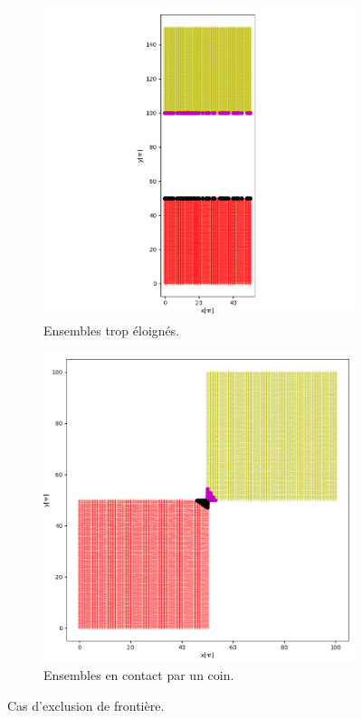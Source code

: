 \documentclass[12pt]{article}
\begin{document}
    \begin{figure}[ht!]
        \centering
        \begin{subfigure}[b]{0.475\textwidth}
            \centering
            \includegraphics[width=\textwidth]{Images/Frontiere_pts_carre1-5.png}
            \caption[]%
            {{ \small Ensembles trop éloignés.}}    
        \end{subfigure}
        \hfill
        \begin{subfigure}[b]{0.475\textwidth}  
            \centering 
            \includegraphics[width=\textwidth]{Images/Frontiere_pts_carre1-3.png}
            \caption[]%
            {{\small Ensembles en contact par un coin.}}    
        \end{subfigure}
        \caption{Cas d'exclusion de frontière.}
    \end{figure}
\end{document}

